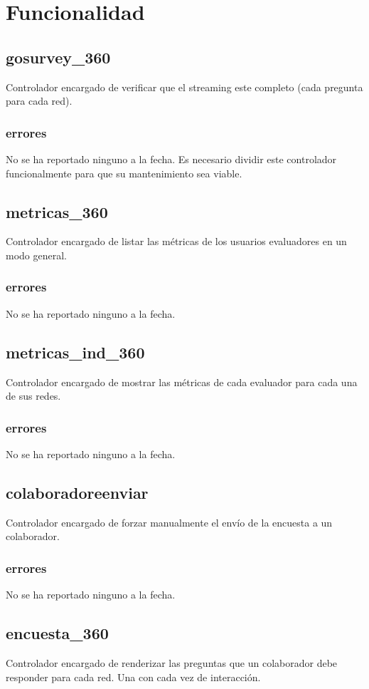 \documentclass[10pt,a4paper]{book}
\begin{document}
	\section{Funcionalidad}


	\subsection{gosurvey\_360}
	Controlador encargado de verificar que el streaming este completo (cada pregunta para cada red).
	\subsubsection{errores}
	No se ha reportado ninguno a la fecha. Es necesario dividir este controlador funcionalmente para que su mantenimiento sea viable.
	
	\subsection{metricas\_360}
	Controlador encargado de listar las métricas de los usuarios evaluadores en un modo general.
	\subsubsection{errores}
	No se ha reportado ninguno a la fecha.
	
	\subsection{metricas\_ind\_360}
	Controlador encargado de mostrar las métricas de cada evaluador para cada una de sus redes.
	\subsubsection{errores}
	No se ha reportado ninguno a la fecha.
	
	\subsection{colaboradoreenviar}
	Controlador encargado de forzar manualmente el envío de la encuesta a un colaborador.
	\subsubsection{errores}
	No se ha reportado ninguno a la fecha.
	
	\subsection{encuesta\_360}
	Controlador encargado de renderizar las preguntas que un colaborador debe responder para cada red. Una con cada vez de interacción.
\end{document}
